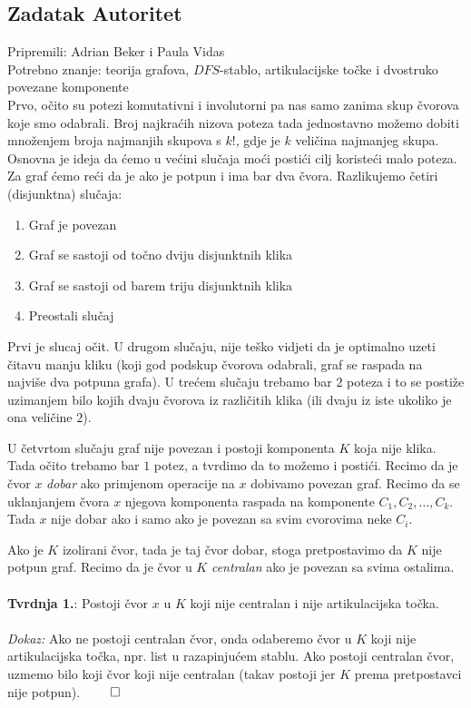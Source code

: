 \subsection*{Zadatak Autoritet}
\textsf{Pripremili: Adrian Beker i Paula Vidas}\\
\textsf{Potrebno znanje: teorija grafova, $DFS$-stablo, artikulacijske točke i dvostruko povezane komponente}\\
Prvo, očito su potezi komutativni i involutorni pa nas samo zanima skup čvorova koje smo odabrali. Broj najkraćih nizova poteza tada jednostavno možemo dobiti množenjem broja najmanjih skupova s $k!$, gdje je $k$ veličina najmanjeg skupa. Osnovna je ideja da ćemo u većini slučaja moći postići cilj koristeći malo poteza. Za graf ćemo reći da je  ako je potpun i ima bar dva čvora. Razlikujemo četiri (disjunktna) slučaja:

\begin{enumerate}
    \item Graf je povezan
    \item Graf se sastoji od točno dviju disjunktnih klika
    \item Graf se sastoji od barem triju disjunktnih klika
    \item Preostali slučaj
\end{enumerate}
Prvi je slucaj očit. U drugom slučaju, nije teško vidjeti da je optimalno uzeti čitavu manju kliku (koji god podskup čvorova odabrali, graf se raspada na najviše dva potpuna grafa).
U trećem slučaju trebamo bar $2$ poteza i to se postiže uzimanjem bilo kojih dvaju čvorova iz različitih klika (ili dvaju iz iste ukoliko je ona veličine $2$).

U četvrtom slučaju graf nije povezan i postoji komponenta $K$ koja nije klika. Tada očito trebamo bar $1$ potez, a tvrdimo da to možemo i postići. Recimo da je čvor $x$ \textit{dobar} ako primjenom operacije na $x$ dobivamo povezan graf. Recimo da se uklanjanjem čvora $x$ njegova komponenta raspada na komponente $C_1, C_2, …, C_k$. Tada $x$ nije dobar ako i samo ako je povezan sa svim cvorovima neke $C_i$.

Ako je $K$ izolirani čvor, tada je taj čvor dobar, stoga pretpostavimo da $K$ nije potpun graf. Recimo da je čvor u $K$ \textit{centralan} ako je povezan sa svima ostalima.
\\\\
\textbf{Tvrdnja 1.}: Postoji čvor $x$ u $K$ koji nije centralan i nije artikulacijska točka.
\\\\
\textit{Dokaz:} Ako ne postoji centralan čvor, onda odaberemo čvor u $K$ koji nije artikulacijska točka, npr. list u razapinjućem stablu. Ako postoji centralan čvor, uzmemo bilo koji čvor koji nije centralan (takav postoji jer $K$ prema pretpostavci nije potpun). $\qed$


